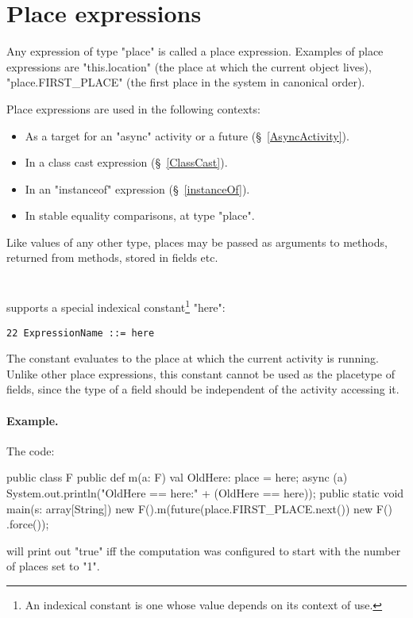 \section{Place expressions}
Any expression of type \xcd"place" is called a place expression. 
Examples of place expressions are \xcd"this.location" (the place
at which the current object lives), \xcd"place.FIRST_PLACE"
(the first place in the system in canonical order). 

Place expressions are used in the following contexts: 
\begin{itemize}
\item As a target for an \xcd"async" activity or a future
(\S~\ref{AsyncActivity}).
\item In a class cast expression  (\S~\ref{ClassCast}).
\item In an \xcd"instanceof" expression (\S~\ref{instanceOf}).
\item In stable equality comparisons, at type \xcd"place".
\end{itemize}

Like values of any other type, places may be passed as arguments
to methods, returned from methods, stored in fields etc.

\section{}\label{Here}
\Xten{} supports a special indexical constant\footnote{
An indexical constant is one whose value depends on its context
of use.} \xcd"here":
\begin{verbatim}
22 ExpressionName ::= here
\end{verbatim}
The constant evaluates to the place at which the current activity is
running. Unlike other place expressions, this constant cannot be 
used as the placetype of fields, since the type of a field 
should be independent of the activity accessing it.

\paragraph{Example.}
The code:
\begin{xten}
public class F {
  public def m(a: F) {
    val OldHere: place = here;
    async (a) {
      System.out.println("OldHere == here:" 
                         + (OldHere == here));
    }
  }
  public static void main(s: array[String]) {
    new F().m(future(place.FIRST_PLACE.next())
              { new F() }.force());
  }
}  
\end{xten}
\noindent will print out \xcd"true" iff the computation was configured
to start with the number of places set to \xcd"1". 


